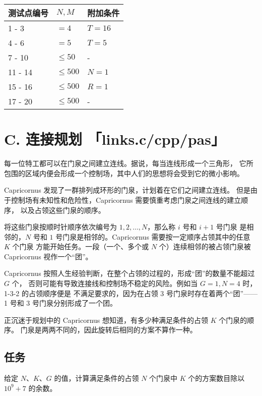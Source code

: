 \documentclass[UTF8, 11pt, a4paper]{article}
\begin{document}
\begin{table}[h]\centering
\begin{tabularx}{0.85 \textwidth}{X|X|X} \hline
测试点编号 & $N, M$     & 附加条件 \\ \hline\hline
1 - 3      & $= 4$      & $T = 16$ \\ \hline
4 - 6      & $= 5$      & $T = 5$ \\ \hline
7 - 10     & $\leq 50$  & - \\ \hline
11 - 14    & $\leq 500$ & $N = 1$ \\ \hline
15 - 16    & $\leq 500$ & $R = 1$ \\ \hline
17 - 20    & $\leq 500$ & - \\ \hline
\end{tabularx}
\end{table}
\newpage


\section*{C. \makebox[1em]{} 连接规划 \makebox[2.5em]{} \small{「links.c/cpp/pas」}}
每一位特工都可以在门泉之间建立连线。据说，每当连线形成一个三角形，%
它所包围的区域内便会形成一个控制场，其中人们的思想将会受到它的微小影响。

Capricornus 发现了一群排列成环形的门泉，计划着在它们之间建立连线。%
但是由于控制场有未知性和危险性，Capricornus 需要慎重考虑门泉之间连线的建立顺序，%
以及占领这些门泉的顺序。

将这些门泉按顺时针顺序依次编号为 $1, 2, \dots, N$，那么称 $i$ 号和 $i + 1$ 号门泉%
是相邻的，$N$ 号和 $1$ 号门泉是相邻的。Capricornus 需要按一定顺序占领其中的任意 $K$ 个门泉%
方能开始任务。一段（一个、多个或 $N$ 个）连续相邻的被占领门泉被 Capricornus 视作一个“团”。

Capricornus 按照人生经验判断，在整个占领的过程的，形成“团”的数量不能超过 $G$ 个，%
否则可能有导致连接线和控制场不稳定的风险。例如当 $G = 1, N = 4$ 时，1-3-2 的占领顺序便是%
不满足要求的，因为在占领 3 号门泉时存在着两个“团”——1 号和 3 号门泉分别形成了一个团。

正沉迷于规划中的 Capricornus 想知道，有多少种满足条件的占领 $K$ 个门泉的顺序。%
门泉是两两不同的，因此旋转后相同的方案不算作一种。

\subsection*{任务}
给定 $N$、$K$、$G$ 的值，计算满足条件的占领 $N$ 个门泉中 $K$ 个的方案数目除以 $10^9 + 7$ 的余数。
\end{document}
